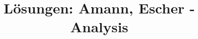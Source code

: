 \documentclass[a4paper,11pt,DIV0]{scrreprt}
\theoremstyle{definition}
\begin{document}
\title{Lösungen: Amann, Escher - Analysis}
\author{}
\date{}
\maketitle
\newpage









\end{document}
